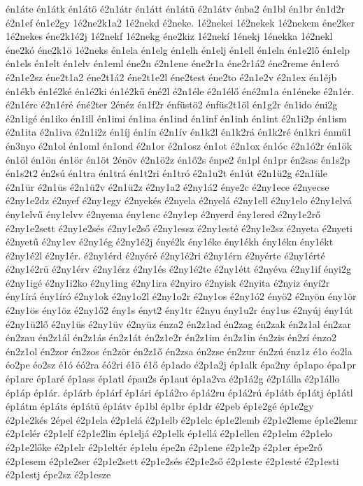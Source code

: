 {én1áte
én1átk
én1átö
é2n1átr
én1átt
én1átü
é2n1átv
énba2
én1bl
én1br
én1d2r
é2n1ef
én1e2gy
1é2ne2k1a2
1é2nekd
é2neke.
1é2nekei
1é2nekek
1é2nekem
éne2ker
1é2nekes
éne2k1é2j
1é2nekf
1é2nekg
éne2kiz
1é2nekí
1énekj
1énekka
1é2nekl
éne2kó
éne2k1ö
1é2neks
én1ela
én1elg
én1elh
én1elj
én1ell
én1eln
én1e2lő
én1elp
én1els
én1elt
én1elv
én1eml
éne2n
é2n1ene
éne2r1a
éne2r1á2
éne2reme
én1eró
é2n1e2sz
éne2t1a2
éne2t1á2
éne2t1e2l
éne2test
éne2to
é2n1e2v
é2n1ex
én1éjb
én1ékb
én1é2ké
én1é2ki
én1é2kű
éné2l
é2n1éle
é2n1élő
éné2m1a
én1éneke
é2n1ér.
é2n1érc
é2n1éré
éné2ter
2énéz
én1f2r
énfüstö2
énfüs2t1öl
én1g2r
én1ido
éni2g
é2n1igé
én1iko
én1ill
én1imi
én1ina
én1ind
én1inf
én1inh
én1int
é2n1i2p
én1ism
é2n1ita
é2n1iva
é2n1i2z
én1íj
én1ín
é2n1ív
én1k2l
én1k2rá
én1k2ré
én1kri
énmű1
én3nyo
é2n1ol
én1oml
én1ond
é2n1or
é2n1osz
én1ot
é2n1ox
én1óc
é2n1ó2r
én1ök
én1öl
én1ön
én1ör
én1öt
2énöv
é2n1ö2z
én1ő2s
énpe2
én1pl
én1pr
én2sas
én1s2p
én1s2t2
én2sú
én1tra
én1trá
én1t2ri
én1tró
é2n1u2t
én1út
é2n1ü2g
é2n1üle
é2n1ür
é2n1üs
é2n1ü2v
é2n1ü2z
é2ny1a2
é2ny1á2
énye2c
é2ny1ece
é2nyecse
é2ny1e2dz
é2nyef
é2ny1egy
é2nyekés
é2nyela
é2nyelá
é2ny1ell
é2ny1elo
é2ny1elvá
ény1elvű
ény1elvv
é2nyema
ény1enc
é2ny1ep
é2nyerd
ény1ered
é2ny1e2rő
é2ny1e2sett
é2ny1e2sés
é2ny1e2ső
é2ny1essz
é2ny1esté
é2ny1e2sz
é2nyeta
é2nyeti
é2nyetű
é2ny1ev
é2ny1ég
é2ny1é2j
ényé2k
ény1éke
ény1ékh
ény1ékn
ény1ékt
é2ny1é2l
é2ny1ér.
é2ny1érd
é2nyéré
é2ny1é2ri
é2ny1érn
é2nyérte
é2ny1érté
é2ny1é2rü
é2ny1érv
é2ny1érz
é2ny1és
é2ny1é2te
é2ny1étt
é2nyéva
é2ny1if
ényi2g
é2ny1igé
é2ny1i2ko
é2ny1ing
é2ny1ira
é2nyiro
é2nyisk
é2nyita
é2nyiz
ényí2r
ény1írá
ény1író
é2ny1ok
é2ny1o2l
é2ny1o2r
é2ny1os
é2ny1ó2
ényö2
é2nyön
ény1ör
é2ny1ös
ény1öz
é2ny1ő2
ény1s
ényt2
ény1tr
é2nyu
ény1u2r
ény1us
é2nyúj
ény1út
é2ny1ü2lő
é2ny1üs
é2ny1üv
é2nyüz
énza2
én2z1ad
én2zag
én2zak
én2z1al
én2zar
én2zau
én2z1ál
én2z1ás
én2z1át
én2z1e2r
én2z1im
én2z1in
én2zis
én2zí
énzo2
én2z1ol
én2zor
én2zos
én2zör
én2z1ő
én2zsa
én2zse
én2zur
én2zú
énz1z
é1o
éo2la
éo2pe
éo2sz
é1ó
éó2ra
éó2ri
é1ö
é1ő
ép1ado
é2p1a2j
ép1alk
épa2ny
ép1apo
épa1pr
ép1arc
ép1aré
ép1ass
ép1atl
épau2s
ép1aut
ép1a2va
é2p1á2g
é2p1álla
é2p1állo
ép1áp
ép1ár.
ép1árb
ép1árf
ép1ári
ép1á2ro
ép1á2ru
ép1á2rú
ép1átb
ép1átj
ép1átl
ép1átm
ép1áts
ép1átü
ép1átv
ép1bl
ép1br
ép1dr
é2peb
ép1e2gé
ép1e2gy
é2p1e2kés
2épel
é2p1ela
é2p1elá
é2p1elb
é2p1elc
ép1e2lemb
é2p1e2leme
ép1e2lemr
é2p1elér
é2p1elf
é2p1e2lin
ép1eljá
é2p1elk
ép1ellá
é2p1ellen
é2p1elm
é2p1elo
é2p1e2lőke
é2p1elr
é2p1eltér
ép1elu
épe2n
é2p1ene
é2p1e2p
é2p1er
épe2rő
é2p1esem
é2p1e2ser
é2p1e2sett
é2p1e2sés
é2p1e2ső
é2p1este
é2p1esté
é2p1esti
é2p1estj
épe2sz
é2p1esze
}
